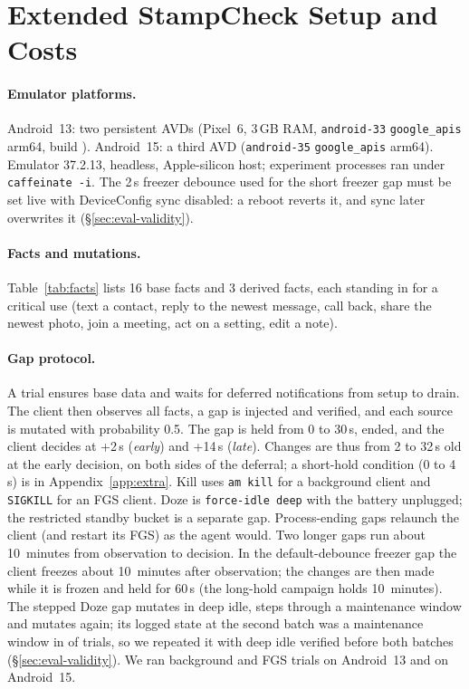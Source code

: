 \section{Extended StampCheck Setup and Costs}
\label{app:stamp-based}
\paragraph{Emulator platforms.} Android~13: two persistent AVDs (Pixel~6, 3\,GB RAM, \texttt{android-33} \texttt{google\_apis} arm64, build ). Android~15: a third AVD (\texttt{android-35} \texttt{google\_apis} arm64). Emulator 37.2.13, headless, Apple-silicon host; experiment processes ran under \texttt{caffeinate -i}. The 2\,s freezer debounce used for the short freezer gap must be set live with DeviceConfig sync disabled: a reboot reverts it, and sync later overwrites it (\S\ref{sec:eval-validity}).

\paragraph{Facts and mutations.} Table~\ref{tab:facts} lists 16 base facts and 3 derived facts, each standing in for a critical use (text a contact, reply to the newest message, call back, share the newest photo, join a meeting, act on a setting, edit a note).
\paragraph{Gap protocol.} A trial ensures base data and waits for deferred notifications from setup to drain. The client then observes all facts, a gap is injected and verified, and each source is mutated with probability 0.5. The gap is held from 0 to 30\,s, ended, and the client decides at +2\,s (\emph{early}) and +14\,s (\emph{late}). Changes are thus from 2 to 32\,s old at the early decision, on both sides of the deferral; a short-hold condition (0 to 4\,s) is in Appendix~\ref{app:extra}. Kill uses \texttt{am kill} for a background client and \texttt{SIGKILL} for an FGS client. Doze is \texttt{force-idle deep} with the battery unplugged; the restricted standby bucket is a separate gap. Process-ending gaps relaunch the client (and restart its FGS) as the agent would. Two longer gaps run about 10~minutes from observation to decision. In the default-debounce freezer gap the client freezes about 10~minutes after observation; the changes are then made while it is frozen and held for 60\,s (the long-hold campaign holds 10~minutes). The stepped Doze gap mutates in deep idle, steps through a maintenance window and mutates again; its logged state at the second batch was a maintenance window in \DozeMaintTwoLongdoze of \NLongdoze trials, so we repeated it with deep idle verified before both batches (\S\ref{sec:eval-validity}). We ran \ETwoBg background and \ETwoFg FGS trials on Android~13 and \ETwoApi on Android~15.

